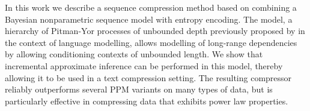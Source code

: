 In this work we describe a sequence compression method based on combining a 
Bayesian nonparametric sequence model with entropy encoding. 
The model, a hierarchy of Pitman-Yor processes of unbounded depth previously
proposed by \citet{wood2009sms} in the context of language modelling, allows
modelling of long-range dependencies by allowing conditioning contexts of
unbounded length.
We show that incremental approximate inference can be performed in this model, 
thereby allowing it to be used in a text compression setting.
The resulting compressor reliably outperforms several PPM variants on many types of data,
but is particularly effective in compressing data that exhibits power law properties.




